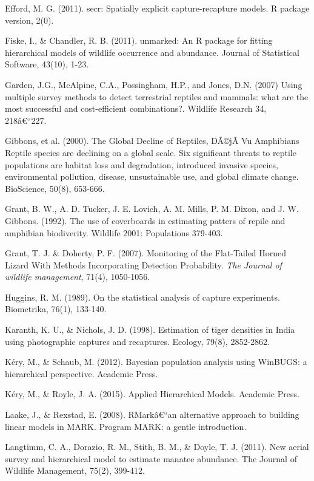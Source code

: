 \documentclass{book}
\begin{document}
\rf Efford, M. G. (2011). secr: Spatially explicit capture-recapture models. R package version, 2(0).

\rf Fiske, I., \& Chandler, R. B. (2011). unmarked: An R package for fitting hierarchical models of wildlife occurrence and abundance. Journal of Statistical Software, 43(10), 1-23.

\rf Garden, J.G., McAlpine, C.A., Possingham, H.P., and Jones, D.N. (2007) Using multiple survey methods to detect terrestrial reptiles and mammals: what are the most successful and cost-efficient combinations?. Wildlife Research 34, 218â€“227.

\rf Gibbons, et al. (2000). The Global Decline of Reptiles, DÃ©jÃ  Vu Amphibians Reptile species are declining on a global scale. Six significant threats to reptile populations are habitat loss and degradation, introduced invasive species, environmental pollution, disease, unsustainable use, and global climate change. BioScience, 50(8), 653-666.

\rf Grant, B. W., A. D. Tucker, J. E. Lovich, A. M. Mills, P. M. Dixon, and J. W. Gibbons. (1992). The use of coverboards in estimating patters of repile and amphibian biodiverity. Wildlife 2001: Populations 379-403.

\rf Grant, T. J. \& Doherty, P. F. (2007). Monitoring of the Flat-Tailed Horned Lizard With Methods Incorporating Detection Probability. \textit{The Journal of wildlife management}, 71(4), 1050-1056.

\rf Huggins, R. M. (1989). On the statistical analysis of capture experiments. Biometrika, 76(1), 133-140.

\rf  Karanth, K. U., \& Nichols, J. D. (1998). Estimation of tiger densities in India using photographic captures and recaptures. Ecology, 79(8), 2852-2862.

\rf K\'{e}ry, M., \& Schaub, M. (2012). Bayesian population analysis using WinBUGS: a hierarchical perspective. Academic Press.

\rf K\'{e}ry, M., \& Royle, J. A. (2015). Applied Hierarchical Models. Academic Press. 

\rf Laake, J., \& Rexstad, E. (2008). RMarkâ€“an alternative approach to building linear models in MARK. Program MARK: a gentle introduction.

\rf Langtimm, C. A., Dorazio, R. M., Stith, B. M., \& Doyle, T. J. (2011). New aerial survey and hierarchical model to estimate manatee abundance. The Journal of Wildlife Management, 75(2), 399-412.
\end{document}
